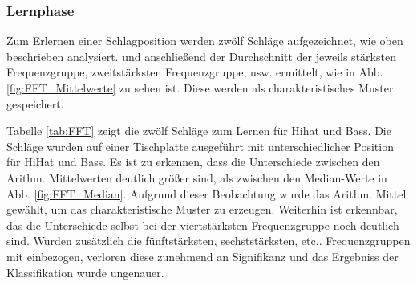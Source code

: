\subsubsection*{Lernphase}
\label{sec:Lernphase}
Zum Erlernen einer Schlagposition werden zwölf Schläge aufgezeichnet, wie oben beschrieben analysiert. und anschließend der Durchschnitt der jeweils stärksten Frequenzgruppe, zweitstärksten Frequenzgruppe, usw. ermittelt, wie in Abb. \ref{fig:FFT_Mittelwerte} zu sehen ist. Diese werden als charakteristisches Muster gespeichert.

Tabelle \ref{tab:FFT} zeigt die zwölf Schläge zum Lernen für Hihat und Bass.
Die Schläge wurden auf einer Tischplatte ausgeführt mit unterschiedlicher Position für HiHat und Bass.
Es ist zu erkennen, dass die Unterschiede zwischen den Arithm. Mittelwerten deutlich größer sind, als zwischen den Median-Werte in Abb. \ref{fig:FFT_Median}. Aufgrund dieser Beobachtung wurde das Arithm. Mittel gewählt, um das charakteristische Muster zu erzeugen. Weiterhin ist erkennbar, das die Unterschiede selbst bei der viertstärksten Frequenzgruppe noch deutlich sind. Wurden zusätzlich die fünftstärksten, sechststärksten, etc.. Frequenzgruppen mit einbezogen, verloren diese zunehmend an Signifikanz und das Ergebniss der Klassifikation wurde ungenauer.

